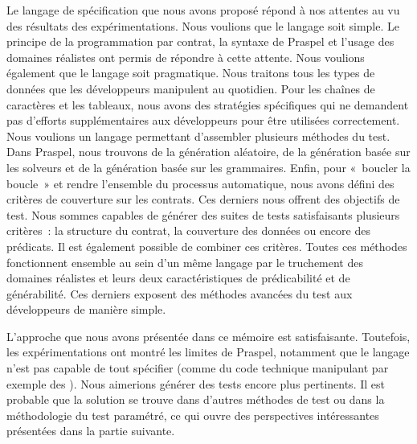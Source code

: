Le langage de spécification que nous avons proposé répond à nos attentes au vu
des résultats des expérimentations. Nous voulions que le langage soit simple. Le
principe de la programmation par contrat, la syntaxe de Praspel et l'usage des
domaines réalistes ont permis de répondre à cette attente. Nous voulions
également que le langage soit pragmatique. Nous traitons tous les types de
données que les développeurs manipulent au quotidien. Pour les chaînes de
caractères et les tableaux, nous avons des stratégies spécifiques qui ne
demandent pas d'efforts supplémentaires aux développeurs pour être utilisées
correctement. Nous voulions un langage permettant d'assembler plusieurs méthodes
du test. Dans Praspel, nous trouvons de la génération aléatoire, de la
génération basée sur les solveurs et de la génération basée sur les grammaires.
Enfin, pour «~boucler la boucle~» et rendre l'ensemble du processus automatique,
nous avons défini des critères de couverture sur les contrats. Ces derniers nous
offrent des objectifs de test. Nous sommes capables de générer des suites de
tests satisfaisants plusieurs critères~: la structure du contrat, la couverture
des données ou encore des prédicats. Il est également possible de combiner ces
critères. Toutes ces méthodes fonctionnent ensemble au sein d'un même langage
par le truchement des domaines réalistes et leurs deux caractéristiques de
prédicabilité et de générabilité. Ces derniers exposent des méthodes avancées du
test aux développeurs de manière simple.

L'approche que nous avons présentée dans ce mémoire est satisfaisante.
Toutefois, les expérimentations ont montré les limites de Praspel, notamment que
le langage n'est pas capable de tout spécifier (comme du code technique
manipulant par exemple des ). Nous aimerions générer des
tests encore plus pertinents. Il est probable que la solution se trouve dans
d'autres méthodes de test ou dans la méthodologie du test paramétré, ce qui
ouvre des perspectives intéressantes présentées dans la partie suivante.
